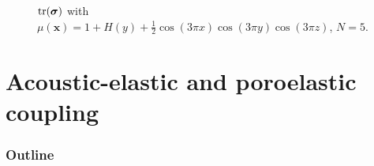 \documentclass[compress]{beamer}
\begin{document}
{\begin{figure}
\begin{overlayarea}{\textwidth}{.75\textheight}
{}
\end{overlayarea}
\caption{${\rm tr}(\bm{\sigma})$ with $\mu(\bm{x}) = 1+ H(y) + \frac{1}{2}\cos(3\pi x)\cos(3\pi y)\cos(3\pi z)$, $N=5$.}
\end{figure}
}

\section{Acoustic-elastic and poroelastic coupling}

\begin{frame}[noframenumbering]
    \frametitle{Outline}
    \tableofcontents[currentsection]
\end{frame}
\end{document}
